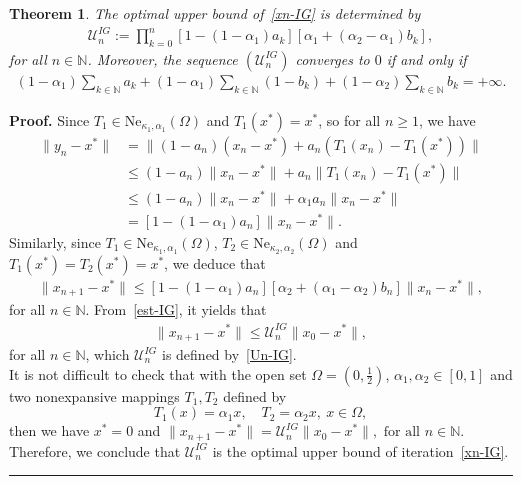 \documentclass[a4paper, 11pt]{article}
\newtheorem{theorem}{Theorem}[section]
\newenvironment{proof}[1][Proof]{\textbf{#1.} }{\hfill\rule{0.5em}{0.5em}}
\begin{document}
		\begin{theorem}\label{theo-U-IG}
			The optimal upper bound of~\eqref{xn-IG} is determined by
			\begin{align}\label{Un-IG}
				\mathcal{U}_n^{IG} := \displaystyle\prod_{k=0}^{n}[1-(1 - \alpha_1) a_k][\alpha_1+(\alpha_2 - \alpha_1)b_k],
			\end{align}
			for all $n \in \mathbb{N}$. Moreover, the sequence $(\mathcal{U}^{IG}_n)$ converges to $0$ if and only if
			\begin{align}\label{iff-Un-IG} 
				(1-\alpha_1) \sum_{k \in \mathbb{N}} a_k + (1-\alpha_1)\sum_{k \in \mathbb{N}} (1-b_k) + (1-\alpha_2)\sum_{k \in \mathbb{N}} b_k = +\infty. 
			\end{align}
		\end{theorem}
		\begin{proof}
			Since $T_1 \in \text{Ne}_{\kappa_1, \alpha_1}(\Omega)$ and $T_1(x^*) = x^*$, so for all $n\ge 1$, we have
			\begin{align*}
				\|y_n-x^*\|&=\|(1-a_n)(x_n-x^*)+a_n(T_1(x_n)-T_1(x^*))\| \\
				& \le (1-a_n) \|x_n-x^*\|+a_n\|T_1(x_n)-T_1(x^*)\|\\
				& \le (1-a_n)\|x_n-x^*\|+ \alpha_1a_n\|x_n-x^*\|\\
				& = [1 - (1 - \alpha_1)a_n]\|x_n-x^*\|.
			\end{align*}
			Similarly, since $T_1 \in \text{Ne}_{\kappa_1, \alpha_1}(\Omega)$, $T_2 \in \text{Ne}_{\kappa_2, \alpha_2}(\Omega)$ and $T_1(x^*) = T_2(x^*) = x^*$, we deduce that
			\begin{align}\label{est-IG} 
				\|x_{n+1} - x^*\| \le [1 - (1-\alpha_1)a_n][\alpha_2+(\alpha_1-\alpha_2)b_n]\|x_n-x^*\|,
			\end{align}
			for all $n \in \mathbb{N}$. From~\eqref{est-IG}, it yields that 
			\begin{align}\label{est-Un} 
				\|x_{n+1} - x^*\| \le \mathcal{U}_n^{IG} \|x_0-x^*\|,
			\end{align}
			for all $n \in \mathbb{N}$, which $\mathcal{U}_n^{IG}$ is defined by~\eqref{Un-IG}. \\
			
			It is not difficult to check that with the open set  $\displaystyle\Omega=\left(0,\frac{1}{2}\right)$, $\alpha_1, \alpha_2 \in [0, 1]$ and two nonexpansive mappings $T_1,T_2$ defined by
			$$T_1(x)=\alpha_1x, \quad  T_2=\alpha_2x, \ x \in \Omega,$$
			then we have $x^*=0$ and $\|x_{n+1}-x^*\|=\mathcal{U}^{IG}_{n}\|x_0-x^*\|, \text{ for all } n \in \mathbb{N}.$ Therefore, we conclude that $\mathcal{U}^{IG}_{n}$ is the optimal upper bound of  iteration~\eqref{xn-IG}. \\
			

\end{proof}
\end{document}
